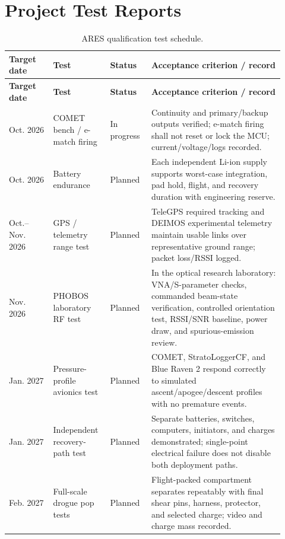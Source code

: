 \documentclass[10pt]{article}
\begin{document}
\section{Project Test Reports}

\begin{longtable}{@{}p{0.15\linewidth}p{0.18\linewidth}p{0.14\linewidth}p{0.45\linewidth}@{}}
\caption{ARES qualification test schedule.}\\
\toprule
\textbf{Target date} & \textbf{Test} & \textbf{Status} & \textbf{Acceptance criterion / record} \\
\midrule
\endfirsthead
\toprule
\textbf{Target date} & \textbf{Test} & \textbf{Status} & \textbf{Acceptance criterion / record} \\
\midrule
\endhead
Oct. 2026 & COMET bench / e-match firing & In progress & Continuity and primary/backup outputs verified; e-match firing shall not reset or lock the MCU; current/voltage/logs recorded. \\
Oct. 2026 & Battery endurance & Planned & Each independent Li-ion supply supports worst-case integration, pad hold, flight, and recovery duration with engineering reserve. \\
Oct.--Nov. 2026 & GPS / telemetry range test & Planned & TeleGPS required tracking and DEIMOS experimental telemetry maintain usable links over representative ground range; packet loss/RSSI logged. \\
Nov. 2026 & PHOBOS laboratory RF test & Planned & In the optical research laboratory: VNA/S-parameter checks, commanded beam-state verification, controlled orientation test, RSSI/SNR baseline, power draw, and spurious-emission review. \\
Jan. 2027 & Pressure-profile avionics test & Planned & COMET, StratoLoggerCF, and Blue Raven 2 respond correctly to simulated ascent/apogee/descent profiles with no premature events. \\
Jan. 2027 & Independent recovery-path test & Planned & Separate batteries, switches, computers, initiators, and charges demonstrated; single-point electrical failure does not disable both deployment paths. \\
Feb. 2027 & Full-scale drogue pop tests & Planned & Flight-packed compartment separates repeatably with final shear pins, harness, protector, and selected charge; video and charge mass recorded. \\

\end{longtable}
\end{document}
